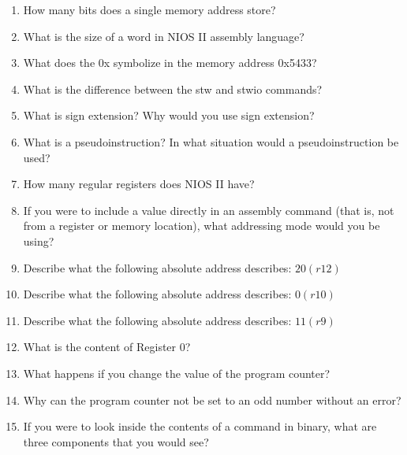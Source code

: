 \documentclass[10pt]{article}
\begin{document}
\begin{itemize}
\begin{enumerate}
    \vspace{1in}

\newpage

\item How many bits does a single memory address store?

\item What is the size of a word in NIOS II assembly language?

\item What does the 0x symbolize in the memory address 0x5433?

\item What is the difference between the stw and stwio commands?

\item What is sign extension?  Why would you use sign extension?

\item What is a pseudoinstruction?  In what situation would a pseudoinstruction be used?

\item How many regular registers does NIOS II have?

\item If you were to include a value directly in an assembly command (that is, not from a register or memory location), what addressing mode would you be using?

\item Describe what the following absolute address describes: $20(r12)$

\item Describe what the following absolute address describes: $0(r10)$

\item Describe what the following absolute address describes: $11(r9)$

\item What is the content of Register 0?

\item What happens if you change the value of the program counter?

\item Why can the program counter not be set to an odd number without an error?

\item If you were to look inside the contents of a command in binary, what are three components that you would see?



\end{enumerate}

\end{itemize}
\end{document}
